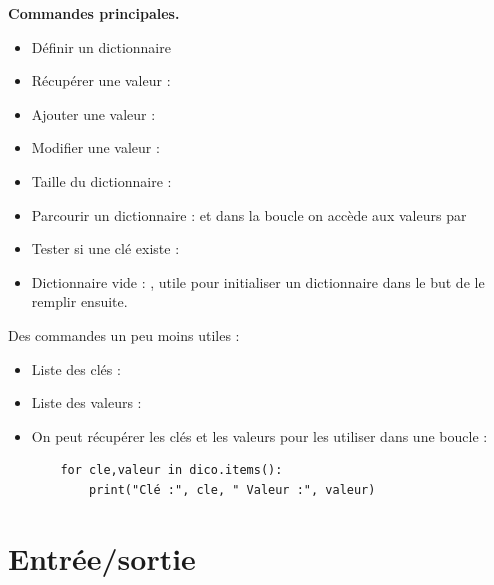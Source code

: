 \documentclass[11pt,class=report,crop=false]{standalone}
\begin{document}
\medskip

\textbf{Commandes principales.}

\begin{itemize}
	\item Définir un dictionnaire 
	
	\item Récupérer une valeur : 
	
	\item Ajouter une valeur : 
	
	\item Modifier une valeur : 
	
	\item Taille du dictionnaire : 
	
	\item Parcourir un dictionnaire :  et dans la boucle on accède aux valeurs par 
	
	\item Tester si une clé existe : 
	
	\item Dictionnaire vide : , utile pour initialiser un dictionnaire dans le but de le remplir ensuite.
\end{itemize}  

\bigskip

Des commandes un peu moins utiles :
\begin{itemize}
	
	\item Liste des clés : 
	
	\item Liste des valeurs : 
	
	\item On peut récupérer les clés et les valeurs pour les utiliser dans une boucle :
	\begin{lstlisting}
	for cle,valeur in dico.items():
	    print("Clé :", cle, " Valeur :", valeur)
	\end{lstlisting}
\end{itemize}


\section{Entrée/sortie}
\end{document}
